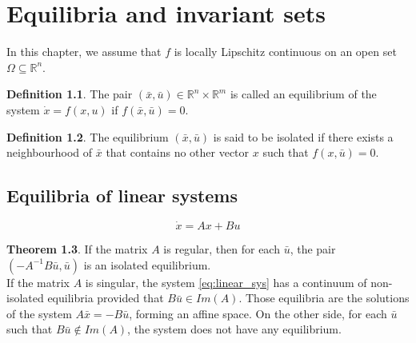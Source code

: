 \documentclass[12pt, openany]{report}
\theoremstyle{definition}
\newtheorem{thm}{Theorem}[chapter]
\newtheorem{definition}[thm]{Definition}
\newcommand{\R}{\mathbb{R}}
\begin{document}
\chapter{Equilibria and invariant sets}
In this chapter, we assume that \(f\) is locally Lipschitz continuous on an open set \(\Omega \subseteq \R^n\). 
\begin{definition}
    The pair \((\bar x, \bar u)\in \R^n\times \R^m\) is called an equilibrium of the system \(\dot x=f(x,u)\) if \(f(\bar x, \bar u)=0\). 
\end{definition}
\begin{definition}
    The equilibrium \((\bar x,\bar u)\) is said to be isolated if there exists a neighbourhood of \(\bar x\) that contains no other vector \(x\) such that \(f(x,\bar u)=0\).
\end{definition}
\section{Equilibria of linear systems}
\begin{equation}\label{eq:linear_sys}
    \dot x = Ax+Bu
\end{equation}
\begin{thm}
    If the matrix \(A\) is regular, then for each \(\bar u\), the pair \((-A^{-1}B\bar u, \bar u)\) is an isolated equilibrium.\\
    If the matrix \(A\) is singular, the system \eqref{eq:linear_sys} has a continuum of non-isolated equilibria provided that \(B\bar u\in Im(A)\). Those equilibria are the solutions of the system \(A\bar x=-B\bar u\), forming an affine space. On the other side, for each \(\bar u\) such that \(B\bar u\notin Im(A)\), the system does not have any equilibrium.
\end{thm}
\end{document}
